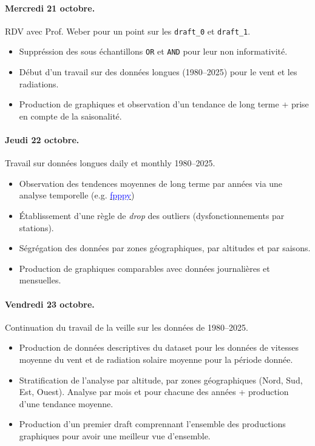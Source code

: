 \documentclass[11pt, a4paper]{article}
\begin{document}
\paragraph{Mercredi 21 octobre.} RDV avec Prof. Weber pour un point sur les \texttt{draft\_0} et \texttt{draft\_1}. 
\begin{itemize}
    \item Suppréssion des sous échantillons \texttt{OR} et \texttt{AND} pour leur non informativité. 
    \item Début d'un travail sur des données longues (1980--2025) pour le vent et les radiations. 
    \item Production de graphiques et observation d'un tendance de long terme + prise en compte de la saisonalité. 
\end{itemize}

\paragraph{Jeudi 22 octobre.} Travail sur données longues daily et monthly 1980--2025. 
\begin{itemize}
    \item Observation des tendences moyennes de long terme par années via une analyse temporelle (e.g. \href{https://otexts.com/fpppy/02-graphics.html#sec-DataFrame}{\textcolor{blue}{fpppy}})
    \item Établissement d'une règle de \textit{drop} des outliers (dysfonctionnements par stations).
    \item Ségrégation des données par zones géographiques, par altitudes et par saisons.
    \item Production de graphiques comparables avec données journalières et mensuelles. 
\end{itemize}

\paragraph{Vendredi 23 octobre.} Continuation du travail de la veille sur les données de 1980--2025.
\begin{itemize}
    \item Production de données descriptives du dataset pour les données de vitesses moyenne du vent et de radiation solaire moyenne pour la période donnée. 
    \item Stratification de l'analyse par altitude, par zones géographiques (Nord, Sud, Est, Ouest). Analyse par mois et pour chacune des années + production d'une tendance moyenne. 
    \item Production d'un premier draft comprennant l'ensemble des productions graphiques pour avoir une meilleur vue d'ensemble.
\end{itemize}
\end{document}
